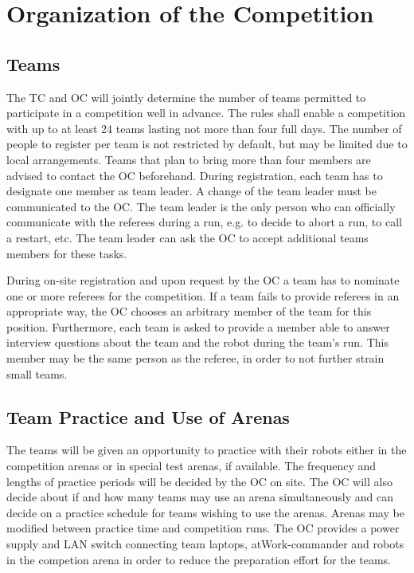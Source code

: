 
\section{Organization of the Competition}\label{sec:organization_of_the_competition}

\subsection{Teams}
The TC and OC will jointly determine the number of teams permitted to participate in a competition well in advance. The rules shall enable a competition with up to at least 24 teams lasting not more than four full days.
The number of people to register per team is not restricted by default, but may be limited due to local arrangements. Teams that plan to bring more than four members are advised to contact the OC beforehand.
During registration, each team has to designate one member as team leader. A change of the team leader must be communicated to the OC. The team leader is the only person who can officially communicate with the referees during a run, e.g. to decide to abort a run, to call a restart, etc. The team leader can ask the OC to accept additional teams members for these tasks.
\par
During on-site registration and upon request by the OC a team has to nominate one or more referees for the competition. If a team fails to provide referees in an appropriate way, the OC chooses an arbitrary member of the team for this position. Furthermore, each team is asked to provide a member able to answer interview questions about the team and the robot during the team's run. This member may be the same person as the referee, in order to not further strain small teams.


\subsection{Team Practice and Use of Arenas}
The teams will be given an opportunity to practice with their robots either in the competition arenas or in special test arenas, if available. The frequency and lengths of practice periods will be decided by the OC on site. The OC will also decide about if and how many teams may use an arena simultaneously and can decide on a practice schedule for teams wishing to use the arenas. Arenas may be modified between practice time and competition runs.
The OC provides a power supply and LAN switch connecting team laptops, atWork-commander and robots in the competion arena in order to reduce
the preparation effort for the teams.

